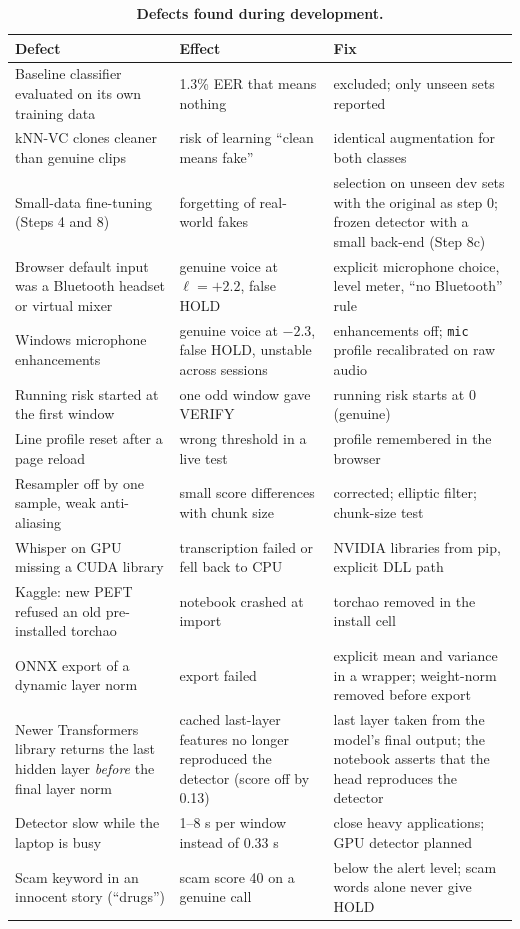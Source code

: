 \documentclass[10pt,a4paper,twocolumn]{article}
\newcommand{\llr}{\ell}
\begin{document}
\begin{table}[t]
\centering\footnotesize
\caption{\textbf{Defects found during development.}}
\label{tab:defects}
\begin{tabular}{@{}p{}p{}p{}@{}}
\toprule
\textbf{Defect} & \textbf{Effect} & \textbf{Fix}\\
\midrule
Baseline classifier evaluated on its own training data & 1.3\% EER that means nothing & excluded; only unseen sets reported\\
kNN-VC clones cleaner than genuine clips & risk of learning ``clean means fake'' & identical augmentation for both classes\\
Small-data fine-tuning (Steps 4 and 8) & forgetting of real-world fakes & selection on unseen dev sets with the original as step 0; frozen detector with a small back-end (Step 8c)\\
Browser default input was a Bluetooth headset or virtual mixer & genuine voice at $\llr=+2.2$, false HOLD & explicit microphone choice, level meter, ``no Bluetooth'' rule\\
Windows microphone enhancements & genuine voice at $-2.3$, false HOLD, unstable across sessions & enhancements off; \texttt{mic} profile recalibrated on raw audio\\
Running risk started at the first window & one odd window gave VERIFY & running risk starts at 0 (genuine)\\
Line profile reset after a page reload & wrong threshold in a live test & profile remembered in the browser\\
Resampler off by one sample, weak anti-aliasing & small score differences with chunk size & corrected; elliptic filter; chunk-size test\\
Whisper on GPU missing a CUDA library & transcription failed or fell back to CPU & NVIDIA libraries from pip, explicit DLL path\\
Kaggle: new PEFT refused an old pre-installed torchao & notebook crashed at import & torchao removed in the install cell\\
ONNX export of a dynamic layer norm & export failed & explicit mean and variance in a wrapper; weight-norm removed before export\\
Newer Transformers library returns the last hidden layer \emph{before} the final layer norm & cached last-layer features no longer reproduced the detector (score off by 0.13) & last layer taken from the model's final output; the notebook asserts that the head reproduces the detector\\
Detector slow while the laptop is busy & 1--8 s per window instead of 0.33 s & close heavy applications; GPU detector planned\\
Scam keyword in an innocent story (``drugs'') & scam score 40 on a genuine call & below the alert level; scam words alone never give HOLD\\
\bottomrule
\end{tabular}
\end{table}
\end{document}
